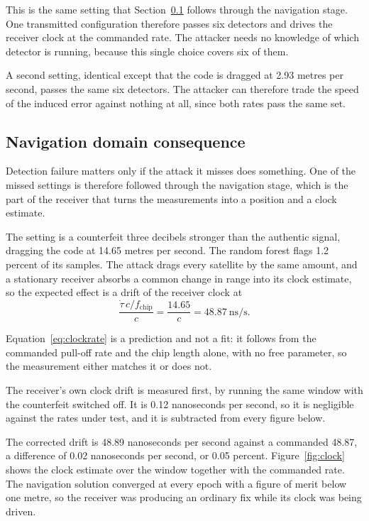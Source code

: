\documentclass[pdflatex,sn-basic]{sn-jnl}
\theoremstyle{thmstyleone}
\theoremstyle{thmstyletwo}
\theoremstyle{thmstylethree}
\begin{document}
This is the same setting that Section~\ref{sec:res_nav} follows through the navigation
stage. One transmitted configuration therefore passes six detectors and drives the
receiver clock at the commanded rate. The attacker needs no knowledge of which detector
is running, because this single choice covers six of them.

A second setting, identical except that the code is dragged at 2.93 metres per second,
passes the same six detectors. The attacker can therefore trade the speed of the induced
error against nothing at all, since both rates pass the same set.

\subsection{Navigation domain consequence}
\label{sec:res_nav}

Detection failure matters only if the attack it misses does something. One of the missed
settings is therefore followed through the navigation stage, which is the part of the
receiver that turns the measurements into a position and a clock estimate.

The setting is a counterfeit three decibels stronger than the authentic signal, dragging
the code at 14.65 metres per second. The random forest flags 1.2 percent of its samples.
The attack drags every satellite by the same amount, and a stationary receiver absorbs a
common change in range into its clock estimate, so the expected effect is a drift of the
receiver clock at
\begin{equation}
\frac{\dot\tau \, c/f_\mathrm{chip}}{c} = \frac{14.65}{c} = 48.87~\mathrm{ns/s}.
\label{eq:clockrate}
\end{equation}

Equation~\ref{eq:clockrate} is a prediction and not a fit: it follows from the commanded
pull-off rate and the chip length alone, with no free parameter, so the measurement either
matches it or does not.

The receiver's own clock drift is measured first, by running the same window with the
counterfeit switched off. It is 0.12 nanoseconds per second, so it is negligible against
the rates under test, and it is subtracted from every figure below.

The corrected drift is 48.89 nanoseconds per second against a commanded 48.87, a
difference of 0.02 nanoseconds per second, or 0.05 percent. Figure~\ref{fig:clock} shows the clock
estimate over the window together with the commanded rate. The navigation solution
converged at every epoch with a figure of merit below one metre, so the receiver was
producing an ordinary fix while its clock was being driven.
\end{document}
